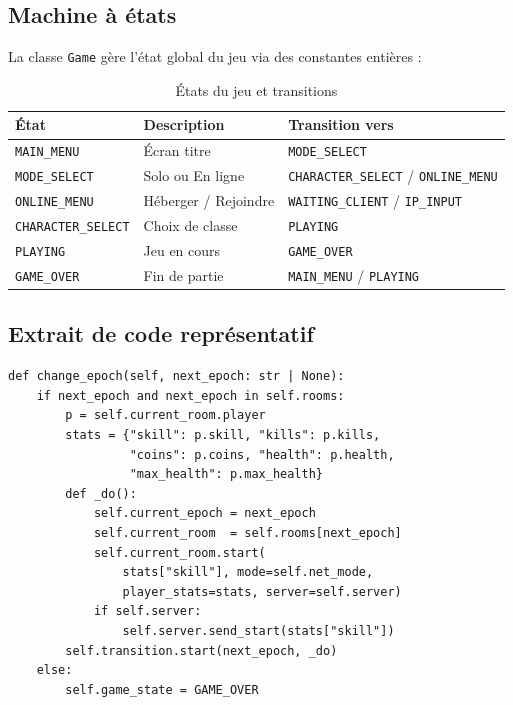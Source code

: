 \documentclass[12pt, a4paper]{report}
\begin{document}
\subsection{Machine \`{a} \'{e}tats}

La classe \texttt{Game} g\`{e}re l'\'{e}tat global du jeu via des constantes enti\`{e}res :

\begin{table}[H]
\centering
\caption{\'{E}tats du jeu et transitions}
\begin{tabular}{lll}
\toprule
\textbf{\'{E}tat} & \textbf{Description} & \textbf{Transition vers} \\
\midrule
\texttt{MAIN\_MENU}        & \'{E}cran titre            & \texttt{MODE\_SELECT} \\
\texttt{MODE\_SELECT}      & Solo ou En ligne       & \texttt{CHARACTER\_SELECT} / \texttt{ONLINE\_MENU} \\
\texttt{ONLINE\_MENU}      & H\'{e}berger / Rejoindre   & \texttt{WAITING\_CLIENT} / \texttt{IP\_INPUT} \\
\texttt{CHARACTER\_SELECT} & Choix de classe        & \texttt{PLAYING} \\
\texttt{PLAYING}           & Jeu en cours           & \texttt{GAME\_OVER} \\
\texttt{GAME\_OVER}        & Fin de partie          & \texttt{MAIN\_MENU} / \texttt{PLAYING} \\
\bottomrule
\end{tabular}
\end{table}

\subsection{Extrait de code repr\'{e}sentatif}

\begin{lstlisting}[caption=M\'{e}thode change\_epoch() dans main.py --- transition d'\'{e}poque avec persistance des stats]
def change_epoch(self, next_epoch: str | None):
    if next_epoch and next_epoch in self.rooms:
        p = self.current_room.player
        stats = {"skill": p.skill, "kills": p.kills,
                 "coins": p.coins, "health": p.health,
                 "max_health": p.max_health}
        def _do():
            self.current_epoch = next_epoch
            self.current_room  = self.rooms[next_epoch]
            self.current_room.start(
                stats["skill"], mode=self.net_mode,
                player_stats=stats, server=self.server)
            if self.server:
                self.server.send_start(stats["skill"])
        self.transition.start(next_epoch, _do)
    else:
        self.game_state = GAME_OVER
\end{lstlisting}
\end{document}
